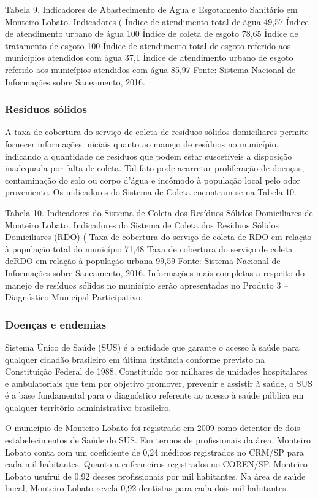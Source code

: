Tabela 9. Indicadores de Abastecimento de Água e Esgotamento Sanitário em Monteiro Lobato.
Indicadores 	(%
Índice de atendimento total de água	49,57
Índice de atendimento urbano de água	100
Índice de coleta de esgoto	78,65
Índice de tratamento de esgoto	100
Índice de atendimento total de esgoto referido aos municípios atendidos com água	37,1
Índice de atendimento urbano de esgoto referido aos municípios atendidos com água	85,97
Fonte: Sistema Nacional de Informações sobre Saneamento, 2016.

\subsubsection{Resíduos sólidos}
A taxa de cobertura do serviço de coleta de resíduos sólidos domiciliares permite fornecer informações iniciais quanto ao manejo de resíduos no município, indicando a quantidade de resíduos que podem estar suscetíveis a disposição inadequada por falta de coleta. Tal fato pode acarretar proliferação de doenças, contaminação do solo ou corpo d’água e incômodo à população local pelo odor proveniente. Os indicadores do Sistema de Coleta encontram-se na Tabela 10.

Tabela 10. Indicadores do Sistema de Coleta dos Resíduos Sólidos Domiciliares de Monteiro Lobato.
Indicadores do Sistema de Coleta dos Resíduos Sólidos Domiciliares (RDO) (%
Taxa de cobertura do serviço de coleta de RDO em relação à população total do município	71,48
Taxa de cobertura do serviço de coleta deRDO em relação à população urbana	99,59
Fonte: Sistema Nacional de Informações sobre Saneamento, 2016.
Informações mais completas a respeito do manejo de resíduos sólidos no município serão apresentadas no Produto 3 – Diagnóstico Municipal Participativo. 

\subsubsection{Doenças e endemias}

Sistema Único de Saúde (SUS) é a entidade que garante o acesso à saúde para qualquer cidadão brasileiro em última instância conforme previsto na Constituição Federal de 1988. Constituído por milhares de unidades hospitalares e ambulatoriais que tem por objetivo promover, prevenir e assistir à saúde, o SUS é a base fundamental para o diagnóstico referente ao acesso à saúde pública em qualquer território administrativo brasileiro. 

O município de Monteiro Lobato foi registrado em 2009 como detentor de dois estabelecimentos de Saúde do SUS. Em termos de profissionais da área, Monteiro Lobato conta com um coeficiente de 0,24 médicos registrados no CRM/SP para cada mil habitantes. Quanto a enfermeiros registrados no COREN/SP, Monteiro Lobato usufrui de 0,92 desses profissionais por mil habitantes. Na área de saúde bucal, Monteiro Lobato revela 0,92 dentistas para cada dois mil habitantes.

